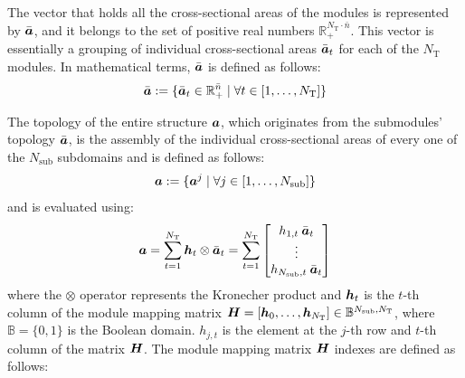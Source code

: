 The vector that holds all the cross-sectional areas of the modules is represented by $\bar{\bm{a}}$, and it belongs to the set of positive real numbers $\mathbb{R}_+^{N_\text{T} \cdot \bar{n}}$. This vector is essentially a grouping of individual cross-sectional areas $\bar{\bm{a}}_t$ for each of the $N_\text{T}$ modules. In mathematical terms, $\bar{\bm{a}}$ is defined as follows:
\begin{equation}
    \bar{\bm{a}} :=  \{ \bar{\bm{a}}_t \in \mathbb{R}_+^{\bar{n}} \;|\; \forall t \in [1,\dots,N_\text{T}]\}
\end{equation}

The topology of the entire structure $\bm{a}$, which originates from the submodules' topology $\bar{\bm{a}}$, is the assembly of the individual cross-sectional areas of every one of the $N_{\text{sub}}$ subdomains and is defined as follows:
\begin{equation}
    \bm{a} :=  \{\bm{a}^j \;|\; \forall j \in [1,\dots,N_{\text{sub}}]\}
\end{equation}
and is evaluated using:
\begin{equation}
    \bm{a} = \sum_{t=1}^{N_\text{T}} \bm{h}_t\otimes\bar{\bm{a}}_t = \sum_{t=1}^{N_\text{T}} \begin{bmatrix}
        h_{1,t} \: \bar{\bm{a}}_t \\
        \vdots\\
        h_{N_{\text{sub}},t} \: \bar{\bm{a}}_t 
        \end{bmatrix}
        \label{eq:05_VL}
\end{equation}
where the $\otimes$ operator represents the Kronecher product and $\bm{h}_{t}$ is the $t$-th column of the module mapping matrix $\bm{H} = [\bm{h}_0,\dots,\bm{h}_{N_\text{T}}] \in \mathbb{B}^{N_{\text{sub}},N_\text{T}}$, where $\mathbb{B}=\lbrace 0,1 \rbrace$ is the Boolean domain. $h_{j,t}$ is the element at the $j$-th row and $t$-th column of the matrix $\bm{H}$. The module mapping matrix $\bm{H}$ indexes are defined as follows:
